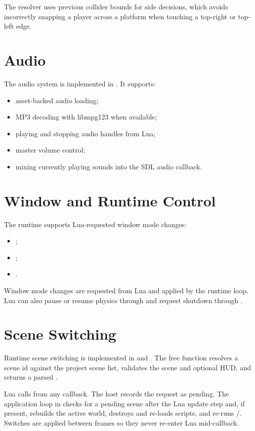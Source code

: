 The resolver uses previous collider bounds for side decisions, which avoids incorrectly snapping a player across a platform when touching a top-right or top-left edge.

\section{Audio}

The audio system is implemented in . It supports:

\begin{itemize}
  \item asset-backed audio loading;
  \item MP3 decoding with libmpg123 when available;
  \item playing and stopping audio handles from Lua;
  \item master volume control;
  \item mixing currently playing sounds into the SDL audio callback.
\end{itemize}

\section{Window and Runtime Control}

The runtime supports Lua-requested window mode changes:

\begin{itemize}
  \item {};
  \item {};
  \item {}.
\end{itemize}

Window mode changes are requested from Lua and applied by the runtime loop. Lua can also pause or resume physics through  and request shutdown through .

\section{Scene Switching}

Runtime scene switching is implemented in  and . The free function  resolves a scene id against the project scene list, validates the scene and optional HUD, and returns a parsed .

Lua calls  from any callback. The host records the request as pending. The application loop in  checks for a pending scene after the Lua update step and, if present, rebuilds the active world, destroys and re-loads scripts, and re-runs /. Switches are applied between frames so they never re-enter Lua mid-callback.
